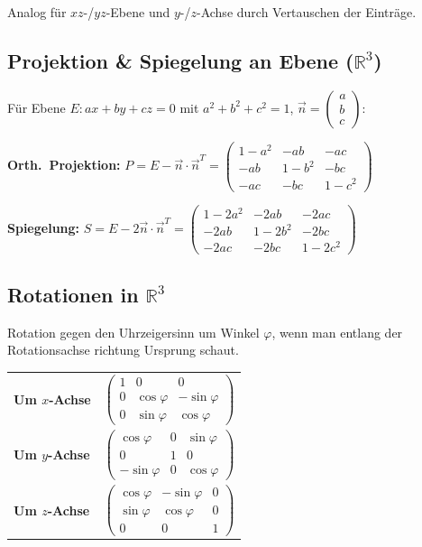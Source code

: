 Analog für $xz$-/$yz$-Ebene und $y$-/$z$-Achse durch Vertauschen der Einträge.

\subsection{Projektion \& Spiegelung an Ebene ($\mathbb{R}^3$)}
Für Ebene $E: ax + by + cz = 0$ mit $a^2+b^2+c^2=1$, $\vec{n}=\begin{pmatrix}a\\b\\c\end{pmatrix}$:

\textbf{Orth.\ Projektion:} $P = E - \vec{n}\cdot\vec{n}^T = \begin{pmatrix} 1-a^2 & -ab & -ac \\ -ab & 1-b^2 & -bc \\ -ac & -bc & 1-c^2 \end{pmatrix}$

\textbf{Spiegelung:} $S = E - 2\vec{n}\cdot\vec{n}^T = \begin{pmatrix} 1-2a^2 & -2ab & -2ac \\ -2ab & 1-2b^2 & -2bc \\ -2ac & -2bc & 1-2c^2 \end{pmatrix}$

\subsection{Rotationen in $\mathbb{R}^3$}
Rotation gegen den Uhrzeigersinn um Winkel $\varphi$, wenn man entlang der Rotationsachse richtung Ursprung schaut.

\begin{tabular}{@{}ll@{}}
    \textbf{Um $x$-Achse} & $\begin{pmatrix} 1 & 0 & 0 \\ 0 & \cos\varphi & -\sin\varphi \\ 0 & \sin\varphi & \cos\varphi \end{pmatrix}$ \\[10pt]
    \textbf{Um $y$-Achse} & $\begin{pmatrix} \cos\varphi & 0 & \sin\varphi \\ 0 & 1 & 0 \\ -\sin\varphi & 0 & \cos\varphi \end{pmatrix}$ \\[10pt]
    \textbf{Um $z$-Achse} & $\begin{pmatrix} \cos\varphi & -\sin\varphi & 0 \\ \sin\varphi & \cos\varphi & 0 \\ 0 & 0 & 1 \end{pmatrix}$
\end{tabular}

